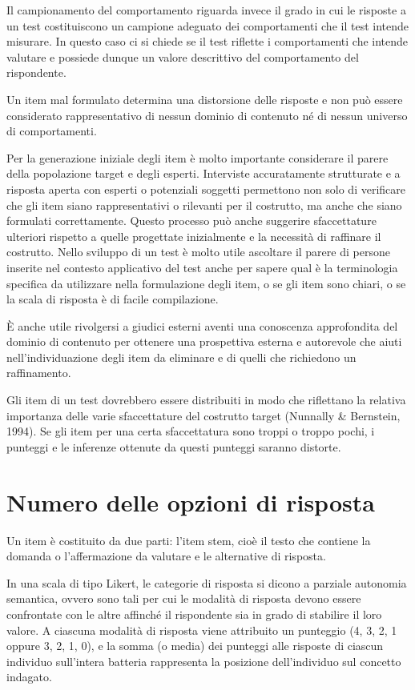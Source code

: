 \documentclass[
  11pt,
]{krantz}
\theoremstyle{definition}
\theoremstyle{definition}
\theoremstyle{definition}
\theoremstyle{definition}
\theoremstyle{remark}
\begin{document}
Il campionamento del comportamento riguarda invece il grado in cui le risposte a un test costituiscono un campione adeguato dei comportamenti che il test intende misurare. In questo caso ci si chiede se il test riflette i comportamenti che intende valutare e possiede dunque un valore descrittivo del comportamento del rispondente.

Un item mal formulato determina una distorsione delle risposte e non può essere considerato rappresentativo di nessun dominio di contenuto né di nessun universo di comportamenti.

Per la generazione iniziale degli item è molto importante considerare il parere della popolazione target e degli esperti. Interviste accuratamente strutturate e a risposta aperta con esperti o potenziali soggetti permettono non solo di verificare che gli item siano rappresentativi o rilevanti per il costrutto, ma anche che siano formulati correttamente. Questo processo può anche suggerire sfaccettature ulteriori rispetto a quelle progettate inizialmente e la necessità di raffinare il costrutto. Nello sviluppo di un test è molto utile ascoltare il parere di persone inserite nel contesto applicativo del test anche per sapere qual è la terminologia specifica da utilizzare nella formulazione degli item, o se gli item sono chiari, o se la scala di risposta è di facile compilazione.

È anche utile rivolgersi a giudici esterni aventi una conoscenza approfondita del dominio di contenuto per ottenere una prospettiva esterna e autorevole che aiuti nell'individuazione degli item da eliminare e di quelli che richiedono un raffinamento.

Gli item di un test dovrebbero essere distribuiti in modo che riflettano la relativa importanza delle varie sfaccettature del costrutto target (Nunnally \& Bernstein, 1994). Se gli item per una certa sfaccettatura sono troppi o troppo pochi, i punteggi e le inferenze ottenute da questi punteggi saranno distorte.

\hypertarget{numero-delle-opzioni-di-risposta}{%
\section{Numero delle opzioni di risposta}\label{numero-delle-opzioni-di-risposta}}

Un item è costituito da due parti: l'item stem, cioè il testo che contiene la domanda o l'affermazione da valutare e le alternative di risposta.

In una scala di tipo Likert, le categorie di risposta si dicono a parziale autonomia semantica, ovvero sono tali per cui le modalità di risposta devono essere confrontate con le altre affinché il rispondente sia in grado di stabilire il loro valore. A ciascuna modalità di risposta viene attribuito un punteggio (4, 3, 2, 1 oppure 3, 2, 1, 0), e la somma (o media) dei punteggi alle risposte di ciascun individuo sull'intera batteria rappresenta la posizione dell'individuo sul concetto indagato.
\end{document}
